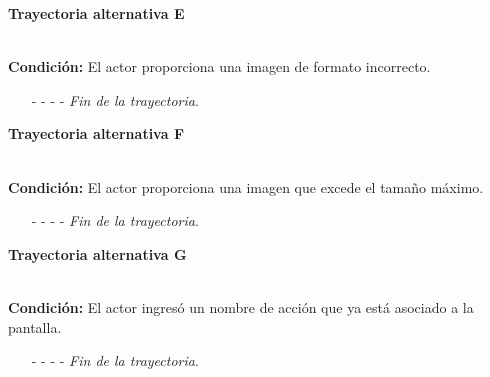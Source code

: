 \hypertarget{CU11-1-1:TAE}{\textbf{Trayectoria alternativa E}}\\
\noindent \textbf{Condición:} El actor proporciona una imagen de formato incorrecto.
\begin{enumerate}
	\UCpaso[\UCsist] Muestra el mensaje  señalando el campo que presenta el error en la pantalla .
	\UCpaso Regresa al paso \ref{CU11.1.1-P3} de la trayectoria principal.
	\item[- -] - - {\em {Fin de la trayectoria}}.
\end{enumerate}
\hypertarget{CU11-1-1:TAF}{\textbf{Trayectoria alternativa F}}\\
\noindent \textbf{Condición:} El actor proporciona una imagen que excede el tamaño máximo.
\begin{enumerate}
	\UCpaso[\UCsist] Muestra el mensaje  señalando el campo que presenta el error en la pantalla .
	\UCpaso Regresa al paso \ref{CU11.1.1-P3} de la trayectoria principal.
	\item[- -] - - {\em {Fin de la trayectoria}}.
\end{enumerate}
\hypertarget{CU11-1-1:TAG}{\textbf{Trayectoria alternativa G}}\\
\noindent \textbf{Condición:} El actor ingresó un nombre de acción que ya está asociado a la pantalla.
\begin{enumerate}
	\UCpaso[\UCsist] Muestra el mensaje  señalando el campo que presenta la duplicidad en la pantalla .
	\UCpaso Regresa al paso \ref{CU11.1.1-P3} de la trayectoria principal.
	\item[- -] - - {\em {Fin de la trayectoria}}.
\end{enumerate}